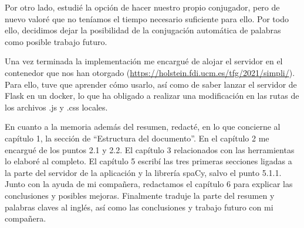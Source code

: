 Por otro lado, estudié la opción de hacer nuestro propio conjugador, pero de nuevo valoré que no teníamos el tiempo necesario suficiente para ello. Por todo ello, decidimos dejar la posibilidad de la conjugación automática de palabras como posible trabajo futuro. 


Una vez terminada la implementación me encargué de alojar el servidor en el contenedor que nos han otorgado (\url{https://holstein.fdi.ucm.es/tfg/2021/simpli/}). Para ello, tuve que aprender cómo usarlo, así como de saber lanzar el servidor de Flask en un docker, lo que ha obligado a realizar una modificación en las rutas de los archivos .js y .css locales.

En cuanto a la memoria además del resumen, redacté, en lo que concierne al capítulo 1, la sección de ``Estructura del documento''. En el capítulo 2  me encargué de los puntos 2.1 y 2.2. El capítulo 3 relacionados con las herramientas lo elaboré al completo. El capítulo 5 escribí las tres primeras secciones ligadas a la parte del servidor de la aplicación y la librería spaCy, salvo el punto 5.1.1. Junto con la ayuda de mi compañera, redactamos el capítulo 6 para explicar las conclusiones y posibles mejoras. Finalmente traduje la parte del resumen y palabras claves al inglés, así como las conclusiones y trabajo futuro con mi compañera.



